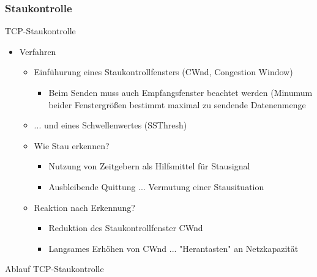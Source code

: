     \subsubsection{Staukontrolle}
      TCP-Staukontrolle
      \begin{itemize}
        \item Verfahren
          \begin{itemize}
            \item Einfühurung eines Staukontrollfensters (CWnd, Congestion Window)
              \begin{itemize}
                \item Beim Senden muss auch Empfangsfenster beachtet werden (Minumum beider
                  Fenstergrößen bestimmt maximal zu sendende Datenenmenge
              \end{itemize}
            \item ... und eines Schwellenwertes (SSThresh)
            \item Wie Stau erkennen?
              \begin{itemize}
                \item Nutzung von Zeitgebern als Hilfsmittel für Stausignal
                \item Ausbleibende Quittung ... Vermutung einer Stausituation
              \end{itemize}
            \item Reaktion nach Erkennung?
              \begin{itemize}
                \item Reduktion des Staukontrollfenster CWnd
                \item Langsames Erhöhen von CWnd ... "Herantasten" an Netzkapazität
              \end{itemize}
          \end{itemize}
      \end{itemize}
      Ablauf TCP-Staukontrolle
